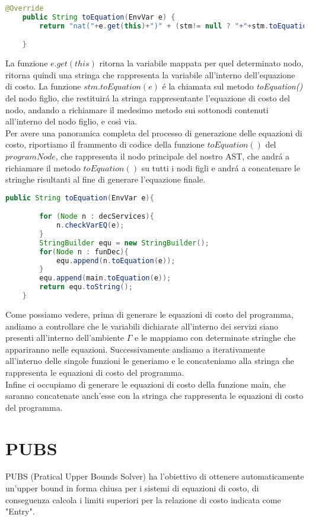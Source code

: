 \documentclass[../../main.tex]{subfiles}
\begin{document}
\begin{lstlisting}[language=Java]
    @Override
    public String toEquation(EnvVar e) {
        return "nat("+e.get(this)+")" + (stm!= null ? "+"+stm.toEquation(e) : "");

    }
\end{lstlisting}

La funzione $e.get(this)$ ritorna la variabile mappata per quel determinato nodo, ritorna quindi una stringa che rappresenta la variabile all'interno dell'equazione di costo. La funzione $stm.toEquation(e)$ é la chiamata sul metodo \textit{toEquation()} del nodo figlio, che restituirá la stringa rappresentante l'equazione di costo del nodo, andando a richiamare il medesimo metodo sui sottonodi contenuti all'interno del nodo figlio, e così via.\\
Per avere una panoramica completa del processo di generazione delle equazioni di costo, riportiamo il frammento di codice della funzione $toEquation()$ del $programNode$, che rappresenta il nodo principale del nostro AST, che andrá a richiamare il metodo $toEquation()$ su tutti i nodi figli e andrá a concatenare le stringhe risultanti al fine di generare l'equazione finale.
\begin{lstlisting}[language=Java, caption={toEquation() del ProgramNode}]
    public String toEquation(EnvVar e){

        for (Node n : decServices){
            n.checkVarEQ(e);
        }
        StringBuilder equ = new StringBuilder();
        for(Node n : funDec){
            equ.append(n.toEquation(e));
        }
        equ.append(main.toEquation(e));
        return equ.toString();
    }
\end{lstlisting}

Come possiamo vedere, prima di generare le equazioni di costo del programma, andiamo a controllare che le variabili dichiarate all'interno dei servizi siano presenti all'interno dell'ambiente $\varGamma$ e le mappiamo con determinate stringhe che appariranno nelle equazioni. Successivamente andiamo a iterativamente all'interno delle singole funzioni le generiamo e le concateniamo alla stringa che rappresenta le equazioni di costo del programma.\\
Infine ci occupiamo di generare le equazioni di costo della funzione main, che saranno concatenate anch'esse con la stringa che rappresenta le equazioni di costo del programma.

\section{PUBS}
\label{sec:pubs}
PUBS (Pratical Upper Bounds Solver) ha l'obiettivo di ottenere automaticamente un'upper bound in forma chiusa per i sistemi di equazioni di costo, di conseguenza calcola i limiti superiori per la relazione di costo indicata come "Entry".
\end{document}
